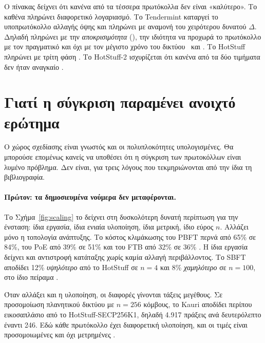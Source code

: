 Ο πίνακας δείχνει ότι κανένα από τα τέσσερα πρωτόκολλα δεν είναι
«καλύτερο». Το καθένα πληρώνει διαφορετικό λογαριασμό. Το Tendermint
καταργεί το υποπρωτόκολλο αλλαγής όψης και πληρώνει με αναμονή του
χειρότερου δυνατού $\Delta$. Δηλαδή πληρώνει με την \emph{αποκρισιμότητα}
(), την ιδιότητα να προχωρά το πρωτόκολλο με τον
πραγματικό και όχι με τον μέγιστο χρόνο του δικτύου
\cite{buchman2018gossip}\prep\ και \cite{malkhi2023hotstuff2}\prep. Το
HotStuff πληρώνει με τρίτη φάση \cite{yin2019hotstuff}. Το HotStuff-2
ισχυρίζεται ότι κανένα από τα δύο τιμήματα δεν ήταν αναγκαίο
\cite{malkhi2023hotstuff2}\prep.

\section{Γιατί η σύγκριση παραμένει ανοιχτό ερώτημα}
\label{sec:opengap}

Ο χώρος σχεδίασης είναι γνωστός και οι πολυπλοκότητες υπολογισμένες. Θα
μπορούσε επομένως κανείς να υποθέσει ότι η σύγκριση των πρωτοκόλλων είναι
λυμένο πρόβλημα. Δεν είναι, για τρεις λόγους που τεκμηριώνονται από την
ίδια τη βιβλιογραφία.

\paragraph{Πρώτον: τα δημοσιευμένα νούμερα δεν μεταφέρονται.}
Το Σχήμα~\ref{fig:scaling} το δείχνει στη δυσκολότερη δυνατή περίπτωση
για την ένσταση: ίδια εργασία, ίδια ενιαία υλοποίηση, ίδια μετρική, ίδιο
εύρος $n$. Αλλάζει μόνο η τοπολογία ανάπτυξης. Το κόστος κλιμάκωσης του
PBFT περνά από 65\% σε 84\%, του PoE από 39\% σε 51\% και του FTB από
32\% σε 36\% \cite{amiri2024bedrock}. Η ίδια εργασία δείχνει και
αντιστροφή κατάταξης χωρίς καμία αλλαγή περιβάλλοντος. Το SBFT αποδίδει
12\% \emph{υψηλότερο}  από το HotStuff σε $n=4$ και 8\%
\emph{χαμηλότερο} σε $n=100$, στο ίδιο πείραμα \cite{amiri2024bedrock}.

Όταν αλλάξει και η υλοποίηση, οι διαφορές γίνονται τάξεις μεγέθους. Σε
προσομοίωση πλανητικού δικτύου με $n=256$ κόμβους, το Kauri αποδίδει
περίπου εικοσαπλάσιο  από το HotStuff-SECP256K1, δηλαδή
4.917 πράξεις ανά δευτερόλεπτο έναντι 246. Εδώ κάθε πρωτόκολλο έχει
διαφορετική υλοποίηση, και οι τιμές είναι προσομοιωμένες και όχι
μετρημένες \cite{berger2023simulation}.

